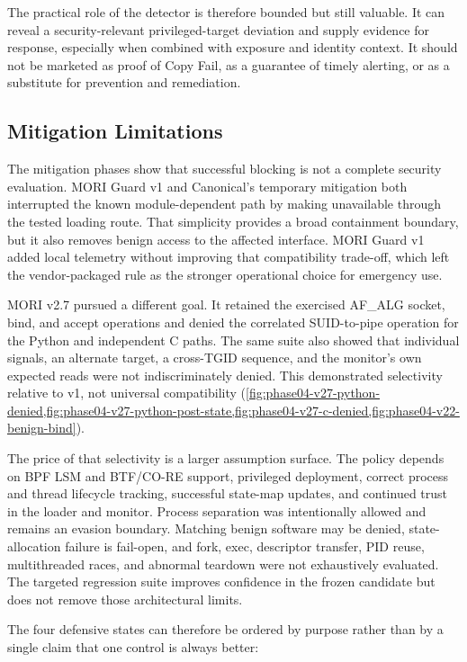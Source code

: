 The practical role of the detector is therefore bounded but still valuable. It
can reveal a security-relevant privileged-target deviation and supply evidence
for response, especially when combined with exposure and identity context. It
should not be marketed as proof of Copy Fail, as a guarantee of timely alerting,
or as a substitute for prevention and remediation.

\subsection{Mitigation Limitations}

The mitigation phases show that successful blocking is not a complete security
evaluation. MORI Guard v1 and Canonical's temporary mitigation both interrupted
the known module-dependent path by making  unavailable through
the tested loading route. That simplicity provides a broad containment boundary,
but it also removes benign access to the affected interface. MORI Guard v1 added
local telemetry without improving that compatibility trade-off, which left the
vendor-packaged rule as the stronger operational choice for emergency use.

MORI v2.7 pursued a different goal. It retained the exercised AF\_ALG socket,
bind, and accept operations and denied the correlated SUID-to-pipe operation for
the Python and independent C paths. The same suite also showed that individual
signals, an alternate target, a cross-TGID sequence, and the monitor's own
expected reads were not indiscriminately denied. This demonstrated selectivity
relative to v1, not universal compatibility
(\cref{fig:phase04-v27-python-denied,fig:phase04-v27-python-post-state,fig:phase04-v27-c-denied,fig:phase04-v22-benign-bind}).

The price of that selectivity is a larger assumption surface. The policy depends
on BPF LSM and BTF/CO-RE support, privileged deployment, correct process and
thread lifecycle tracking, successful state-map updates, and continued trust in
the loader and monitor. Process separation was intentionally allowed and remains
an evasion boundary. Matching benign software may be denied, state-allocation
failure is fail-open, and fork, exec, descriptor transfer, PID reuse,
multithreaded races, and abnormal teardown were not exhaustively evaluated.
The targeted regression suite improves confidence in the frozen candidate but
does not remove those architectural limits.

The four defensive states can therefore be ordered by purpose rather than by a
single claim that one control is always better:


